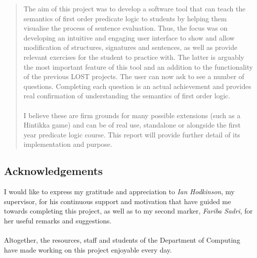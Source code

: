 \documentclass{report}
\begin{document}
\begin{abstract}
The aim of this project was to develop a software tool that can teach the 
semantics of first order predicate logic to students by helping them visualise 
the process of sentence evaluation. Thus, the focus was on developing an 
intuitive and engaging user interface to show and allow modification of 
structures, signatures and sentences, as well as provide relevant exercises for 
the student to practice with. The latter is arguably the most important feature 
of this tool and an addition to the functionality of the previous LOST projects. 
The user can now ask to see a number of questions. Completing each question is 
an actual achievement and provides real confirmation of understanding the 
semantics of first order logic. 
\\ \\
I believe these are firm grounds for many possible extensions (such as a
Hintikka game) and can be of real use, standalone or alongside the first year
predicate logic course. This report will provide further detail of its 
implementation and purpose.
\end{abstract}


\subsection*{\centering Acknowledgements}
I would like to express my gratitude and appreciation to \emph{Ian Hodkinson}, 
my supervisor, for his continuous support and motivation that have guided me 
towards completing this project, as well as to my second marker, \emph{Fariba
Sadri}, for her useful remarks and suggestions.
\\ \\
Altogether, the resources, staff and students of the Department of Computing 
have made working on this project enjoyable every day.

    \tableofcontents

\end{document}
